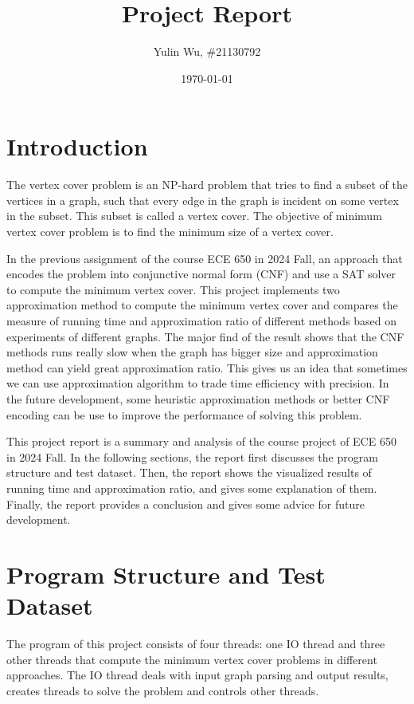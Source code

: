 \documentclass[11pt]{extarticle}
\title{Project Report}
\author{Yulin Wu, \#21130792}
\date{\today}
\begin{document}
\maketitle

\section{Introduction}

The vertex cover problem is an NP-hard problem that tries to find a subset of the vertices in a graph, such that every edge in the graph is incident on some vertex in the subset. This subset is called a vertex cover. The objective of minimum vertex cover problem is to find the minimum size of a vertex cover. 

In the previous assignment of the course ECE 650 in 2024 Fall, an approach that encodes the problem into conjunctive normal form (CNF) and use a SAT solver to compute the minimum vertex cover. This project implements two approximation method to compute the minimum vertex cover and compares the measure of running time and approximation ratio of different methods based on experiments of different graphs. The major find of the result shows that the CNF methods runs really slow when the graph has bigger size and approximation method can yield great approximation ratio. This gives us an idea that sometimes we can use approximation algorithm to trade time efficiency with precision. In the future development, some heuristic approximation methods or better CNF encoding can be use to improve the performance of solving this problem.

This project report is a summary and analysis of the course project of ECE 650 in 2024 Fall. In the following sections, the report first discusses the program structure and test dataset. Then, the report shows the visualized results of running time and approximation ratio, and gives some explanation of them. Finally, the report provides a conclusion and gives some advice for future development.

\section{Program Structure and Test Dataset}

The program of this project consists of four threads: one IO thread and three other threads that compute the minimum vertex cover problems in different approaches. The IO thread deals with input graph parsing and output results, creates threads to solve the problem and controls other threads. 
\end{document}

